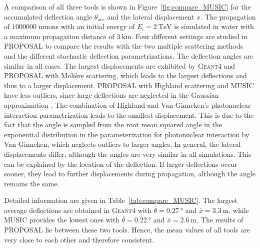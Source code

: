 A comparison of all three tools is shown in Figure~\ref{fig:compare_MUSIC} 
for the 
accumulated deflection angle $\theta_{\text{acc}}$ and the lateral displacement
$x$. 
The propagation of $\num{1000000}$ muons with an 
initial energy of $E_{\mathrm{i}} = \SI{2}{\tera\electronvolt}$ is simulated 
in water with a maximum propagation distance of $\SI{3}{\kilo\meter}$.
Four different settings are studied in PROPOSAL to compare the results with 
the two multiple scattering methods and the different stochastic deflection parametrizations.
The deflection angles are 
similar in all cases. The 
largest displacements are exhibited by \textsc{Geant4} and PROPOSAL with Molière scattering, which 
leads to the largest deflections and thus to a larger displacement. 
PROPOSAL with Highland scattering and MUSIC have less outliers, since large 
deflections are neglected in the Gaussian approximation \cite{HIGHLAND_1975}. 
The combination of Highland and 
Van Ginneken's photonuclear interaction parametrization leads to the smallest 
displacement. This is due to the fact that the angle is sampled from the root mean squared angle in the exponential distribution
in the parameterization for photonuclear interaction by Van Ginneken, which neglects 
outliers to larger angles. 
In general, the lateral displacements differ, although the angles are very similar in all simulations. 
This can be explained by the location of the deflection. If larger deflections occur sooner, 
they lead to further displacements during propagation, although the angle remains the same.

Detailed information are given in Table~\ref{tab:compare_MUSIC}. 
The largest average deflections are obtained in \textsc{Geant4} with 
$\overline{\theta} = \SI{0.27}{\degree}$ 
and $\overline{x} = \SI{3.3}{\meter}$, while MUSIC provides the lowest 
ones with $\overline{\theta} = \SI{0.22}{\degree}$ and 
$\overline{x} = \SI{2.6}{\meter}$.
The results of PROPOSAL lie between 
these two tools. Hence, the mean 
values of all tools are very close to each other and therefore consistent.

